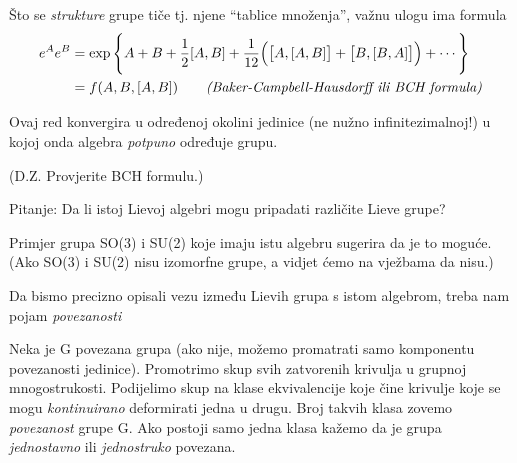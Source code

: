 
Što se \emph{strukture} grupe tiče tj. njene ``tablice množenja'', važnu
ulogu ima formula
\begin{equation}
\begin{split}
  e^A e^B &= \exp\Bigg\{A+B+\frac{1}{2}[A,B]+\frac{1}{12}\Big(\big[A,[A,B]\big]+
 \big[B,[B,A]\big]\Big)+\cdots \Bigg\} \\
          &= f(A,B,[A,B]) \qquad \text{\emph{(Baker-Campbell-Hausdorff ili BCH formula)}}
\end{split}
\end{equation}

Ovaj red konvergira u određenoj okolini jedinice (ne nužno infinitezimalnoj!)
u kojoj onda algebra \emph{potpuno} određuje grupu.

(D.Z. Provjerite BCH formulu.)

Pitanje: Da li istoj Lievoj algebri mogu pripadati različite Lieve grupe?

Primjer grupa SO(3) i SU(2) koje imaju istu algebru sugerira da je to moguće. 
(Ako SO(3) i SU(2) nisu izomorfne grupe, a vidjet ćemo na vježbama da nisu.)

Da bismo precizno opisali vezu između Lievih grupa s istom algebrom, treba
nam pojam \emph{povezanosti}

\begin{definicija}[Povezanost]
  Neka je G povezana grupa (ako nije, možemo promatrati samo komponentu
povezanosti jedinice). Promotrimo skup svih zatvorenih krivulja u grupnoj 
mnogostrukosti. Podijelimo skup  na klase ekvivalencije koje čine 
krivulje koje se mogu \emph{kontinuirano} deformirati jedna u drugu.
Broj takvih klasa zovemo \emph{povezanost} grupe G. Ako postoji samo
jedna klasa kažemo da je grupa \emph{jednostavno} ili \emph{jednostruko}
povezana.
\end{definicija}

